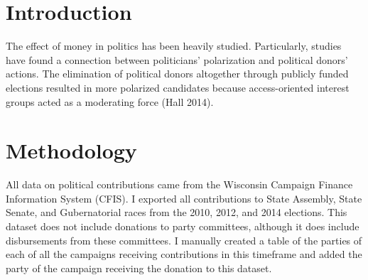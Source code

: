 \documentclass[11pt,]{article}
\begin{document}
\vskip -8.5pt



\noindent  

\hypertarget{introduction}{%
\section{Introduction}\label{introduction}}

The effect of money in politics has been heavily studied. Particularly,
studies have found a connection between politicians' polarization and
political donors' actions. The elimination of political donors
altogether through publicly funded elections resulted in more polarized
candidates because access-oriented interest groups acted as a moderating
force (Hall 2014).

\hypertarget{methodology}{%
\section{Methodology}\label{methodology}}

All data on political contributions came from the Wisconsin Campaign
Finance Information System (CFIS). I exported all contributions to State
Assembly, State Senate, and Gubernatorial races from the 2010, 2012, and
2014 elections. This dataset does not include donations to party
committees, although it does include disbursements from these
committees. I manually created a table of the parties of each of all the
campaigns receiving contributions in this timeframe and added the party
of the campaign receiving the donation to this dataset.
\end{document}
